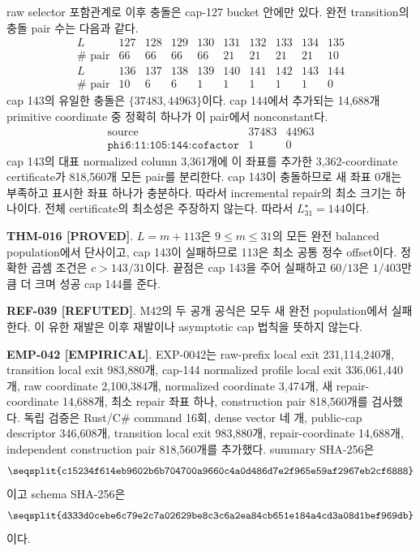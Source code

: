 \documentclass[11pt]{article}
\newcommand{\claimstatus}[2]{\textbf{#1 [#2]}}
\begin{document}
raw selector 포함관계로 이후 충돌은 cap-127 bucket 안에만 있다.
완전 transition의 충돌 pair 수는 다음과 같다.
\[
\begin{array}{c|rrrrrrrrr}
L&127&128&129&130&131&132&133&134&135\\
\hline
\#\text{ pair}&66&66&66&66&21&21&21&21&10
\end{array}
\]
\[
\begin{array}{c|rrrrrrrrr}
L&136&137&138&139&140&141&142&143&144\\
\hline
\#\text{ pair}&10&6&6&1&1&1&1&1&0
\end{array}
\]
cap 143의 유일한 충돌은 \(\{37483,44963\}\)이다. cap 144에서
추가되는 14,688개 primitive coordinate 중 정확히 하나가 이 pair에서
nonconstant다.
\[
\begin{array}{c|rr}
\text{source}&37483&44963\\
\hline
\texttt{phi6:11:105:144:cofactor}&1&0
\end{array}
\]
cap 143의 대표 normalized column 3,361개에 이 좌표를 추가한
3,362-coordinate certificate가 818,560개 모든 pair를 분리한다.
cap 143이 충돌하므로 새 좌표 0개는 부족하고 표시한 좌표 하나가
충분하다. 따라서 incremental repair의 최소 크기는 하나이다. 전체
certificate의 최소성은 주장하지 않는다. 따라서
\(L_{31}^{\star}=144\)이다.

\claimstatus{THM-016}{PROVED}.
\(L=m+113\)은 \(9\le m\le31\)의 모든 완전 balanced population에서
단사이고, cap 143이 실패하므로 113은 최소 공통 정수 offset이다.
정확한 곱셈 조건은 \(c>143/31\)이다. 끝점은 cap 143을 주어 실패하고
\(60/13\)은 \(1/403\)만큼 더 크며 성공 cap 144를 준다.

\claimstatus{REF-039}{REFUTED}.
M42의 두 공개 공식은 모두 새 완전 population에서 실패한다. 이 유한
재발은 이후 재발이나 asymptotic cap 법칙을 뜻하지 않는다.

\claimstatus{EMP-042}{EMPIRICAL}.
EXP-0042는 raw-prefix local exit 231,114,240개, transition local exit
983,880개, cap-144 normalized profile local exit 336,061,440개,
raw coordinate 2,100,384개, normalized coordinate 3,474개, 새
repair-coordinate 14,688개, 최소 repair 좌표 하나, construction
pair 818,560개를 검사했다. 독립 검증은 Rust/C\# command 16회,
dense vector 네 개, public-cap descriptor 346,608개, transition
local exit 983,880개, repair-coordinate 14,688개, independent
construction pair 818,560개를 추가했다. summary SHA-256은
\[
\texttt{\seqsplit{c15234f614eb9602b6b704700a9660c4a0d486d7e2f965e59af2967eb2cf6888}}
\]
이고 schema SHA-256은
\[
\texttt{\seqsplit{d333d0cebe6c79e2c7a02629be8c3c6a2ea84cb651e184a4cd3a08d1bef969db}}
\]
이다.
\end{document}
